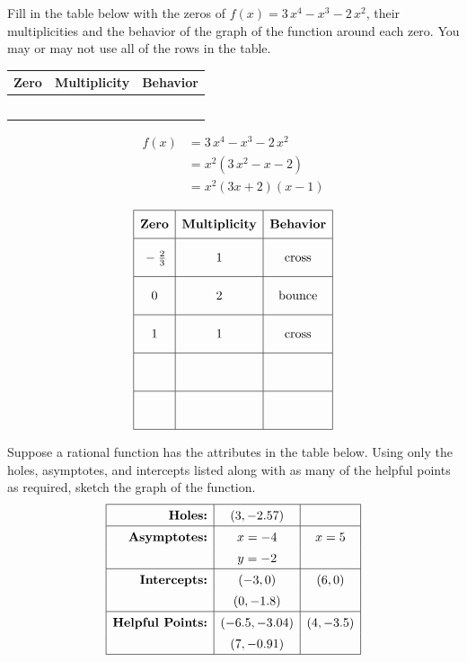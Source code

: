 \documentclass[addpoints]{exam}
\begin{document}
\begin{questions}
\question[10]  Fill in the table below with the zeros of $f(x)=3 \, x^{4} - x^{3} - 2 \, x^{2}$, their multiplicities and the behavior of the graph of the function around each zero. You may or may not use all of the rows in the table.\\
\begin{center}
\renewcommand{\arraystretch}{3}
\begin{tabular}{|p{20mm}|p{25mm}|p{20mm}|}\hline
\textbf{Zero} & \textbf{Multiplicity} & \textbf{Behavior}\\ \hline
 & & \\ \hline
 & & \\ \hline
 & & \\ \hline
 & & \\ \hline
 & & \\ \hline
\end{tabular}
\end{center}
\begin{solution}
\[\begin{aligned} f(x) &= 3 \, x^{4} - x^{3} - 2 \, x^{2} \\ &= x^2(3 \, x^{2} - x - 2) \\ &= x^2(3x + 2)(x - 1) \end{aligned}\]

 \[\begin{array}{|c|c|c|} \hline \rule[-0.8em]{0pt}{2.2em} \textbf{Zero} & \textbf{Multiplicity} & \textbf{Behavior} \\ \hline \rule[-1.2em]{0pt}{3em} -\frac{2}{3} & 1 & \text{cross} \\ \hline \rule[-1.2em]{0pt}{3em} 0 & 2 & \text{bounce} \\ \hline \rule[-1.2em]{0pt}{3em} 1 & 1 & \text{cross} \\ \hline \rule[-1.2em]{0pt}{3em} & & \\ \hline \rule[-1.2em]{0pt}{3em} & & \\ \hline \end{array}\]
\end{solution}
\newpage


\question[5]  Suppose a rational function has the attributes in the table below. Using only the holes, asymptotes, and intercepts listed along with as many of the helpful points as required, sketch the graph of the function.\\
\[\renewcommand{\arraystretch}{1.4} \begin{array}{|r|c|c|} \hline \textbf{Holes:} & (3, -2.57) & \\ \hline \textbf{Asymptotes:} & x = -4 & x = 5 \\ & y = -2 & \\ \hline \textbf{Intercepts:} & (-3, 0) & (6, 0) \\ & (0, -1.8) & \\ \hline \textbf{Helpful Points:} & (-6.5, -3.04) & (4, -3.5) \\ & (7, -0.91) & \\ \hline \end{array}\]


\end{questions}
\end{document}

